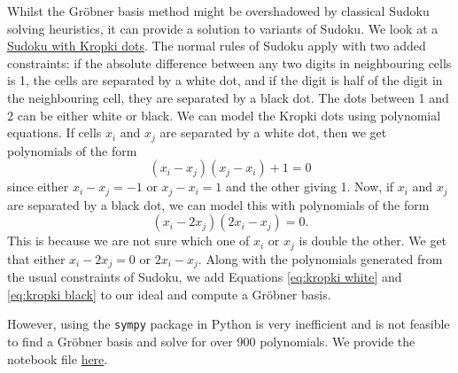 \documentclass[../main.tex]{subfiles}
\begin{document}
    Whilst the Gr\"obner basis method might be overshadowed by classical Sudoku solving heuristics, it can provide a solution to variants of Sudoku. We look at a \href{https://www.funwithpuzzles.com/2018/02/kropki-or-dots--sudoku-puzzle.html}{Sudoku with Kropki dots}. The normal rules of Sudoku apply with two added constraints: if the absolute difference between any two digits in neighbouring cells is 1, the cells are separated by a white dot, and if the digit is half of the digit in the neighbouring cell, they are separated by a black dot. The dots between 1 and 2 can be either white or black. We can model the Kropki dots using polynomial equations. If cells $x_i$ and $x_j$ are separated by a white dot, then we get polynomials of the form
    \begin{equation} \label{eq:kropki white}
        (x_i-x_j)(x_j-x_i)+1=0
    \end{equation}
    since either $x_i-x_j=-1$ or $x_j-x_i=1$ and the other giving 1. Now, if $x_i$ and $x_j$ are separated by a black dot, we can model this with polynomials of the form
    \begin{equation} \label{eq:kropki black}
        (x_i-2x_j)(2x_i-x_j) = 0.
    \end{equation}
    This is because we are not sure which one of $x_i$ or $x_j$ is double the other. We get that either $x_i-2x_j=0$ or $2x_i-x_j$. Along with the polynomials generated from the usual constraints of Sudoku, we add Equations \ref{eq:kropki white} and \ref{eq:kropki black} to our ideal and compute a Gr\"obner basis.
    
    However, using the \texttt{sympy} package in Python is very inefficient and is not feasible to find a Gr\"obner basis and solve for over 900 polynomials. We provide the notebook file \href{https://github.com/yangdabei/graph-colouring-and-sudoku/blob/main/kropki_sudoku.ipynb}{here}.
\end{document}
